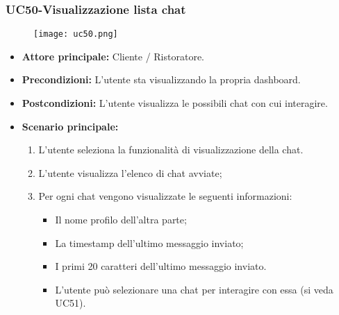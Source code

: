 \subsubsection{UC50-Visualizzazione lista chat}
\begin{figure}[h] \texttt{[image: uc50.png]} \end{figure}
\begin{itemize}
\item \textbf{Attore principale:} Cliente / Ristoratore.
\item \textbf{Precondizioni:} L'utente sta visualizzando la propria dashboard.
\item \textbf{Postcondizioni:} L'utente visualizza le possibili chat con cui interagire.
\item \textbf{Scenario principale:}
\begin{enumerate}
    \item L'utente seleziona la funzionalità di visualizzazione della chat.
    \item L'utente visualizza l'elenco di chat avviate;
    \item Per ogni chat vengono visualizzate le seguenti informazioni:
      \begin{itemize}
        \item Il nome profilo dell'altra parte;
        \item La timestamp dell'ultimo messaggio inviato;
        \item I primi 20 caratteri dell'ultimo messaggio inviato.
\item L'utente può selezionare una chat per interagire con essa (si veda UC51).
      \end{itemize}
\end{enumerate}
\end{itemize}

\pagebreak

